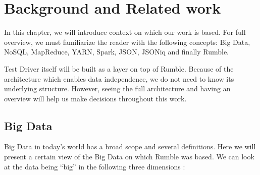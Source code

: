 \chapter{Background and Related work}
In this chapter, we will introduce context on which our work is based. For full overview, we must familiarize the reader with the following concepts: Big Data, NoSQL, MapReduce, YARN, Spark, JSON, JSONiq and finally Rumble.

Test Driver itself will be built as a layer on top of Rumble. Because of the architecture which enables data independence, we do not need to know its underlying structure. However, seeing the full architecture and having an overview will help us make decisions throughout this work.

\section{Big Data}
Big Data in today's world has a broad scope and several definitions. Here we will present a certain view of the Big Data on which Rumble was based. We can look at the data being ``big'' in the following three dimensions \cite{BigDataCourse}:%
